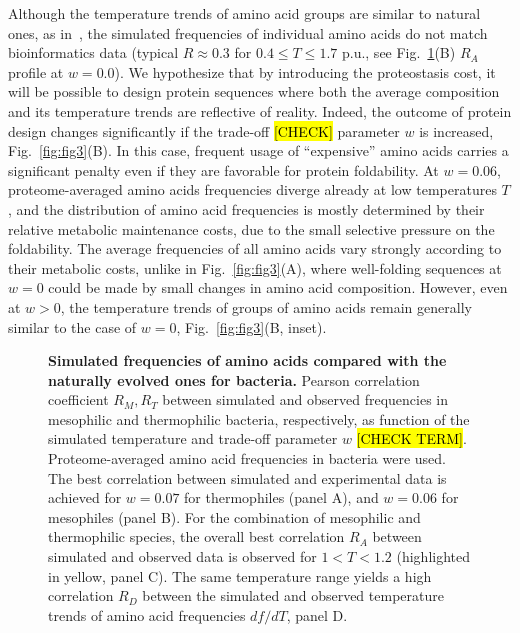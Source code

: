 \documentclass[10pt,letterpaper]{article}
\begin{document}
Although the temperature trends of amino acid groups are similar to natural ones, as in~\cite{Berezovsky2007Positive,Venev2015Massively}, the simulated frequencies of individual amino acids do not match bioinformatics data (typical $R\approx0.3$ for $0.4\leq T\leq 1.7$ p.u., see Fig.~\ref{fig:fig4}(B) $R_A$ profile at $w=0.0$). We hypothesize that by introducing the proteostasis cost, it will be possible to design protein sequences where both the average composition and its temperature trends are reflective of reality. Indeed, the outcome of protein design changes significantly if the  trade-off \hl{[CHECK]} parameter $w$ is increased, Fig.~\ref{fig:fig3}(B). In this case, frequent usage of ``expensive'' amino acids carries a significant penalty even if they are favorable for protein foldability.
At $w=0.06$, proteome-averaged amino acids frequencies diverge already at low temperatures $T$, 
and the distribution of amino acid frequencies is mostly determined by their relative metabolic maintenance costs, due to the small selective pressure on the foldability. The average frequencies of all amino acids vary strongly according to their metabolic costs, unlike in Fig.~\ref{fig:fig3}(A), where well-folding sequences at $w=0$ could be made by small changes in amino acid composition. However, even at $w>0$, the temperature trends of groups of amino acids remain generally similar to the case of $w=0$, Fig.~\ref{fig:fig3}(B, inset).


\begin{figure}[h!]
\caption{
{\bf Simulated frequencies of amino acids compared with the naturally evolved ones for bacteria.} 
Pearson correlation coefficient $R_M, R_T$ between simulated and observed frequencies in mesophilic and thermophilic bacteria, respectively, as function of the simulated temperature and trade-off parameter $w$ \hl{[CHECK TERM]}. Proteome-averaged amino acid frequencies in bacteria were used. The best correlation between simulated and experimental data is achieved for $w=0.07$ for thermophiles (panel A), and $w=0.06$ for mesophiles (panel B). For the combination of mesophilic and thermophilic species, the overall best correlation $R_A$ between simulated and observed data is observed for $1<T<1.2$ (highlighted in yellow, panel C). The same temperature range yields a high correlation $R_D$ between the simulated and observed temperature trends of amino acid frequencies $df/dT$, panel D.
}
\label{fig:fig4}
\end{figure}
\end{document}
